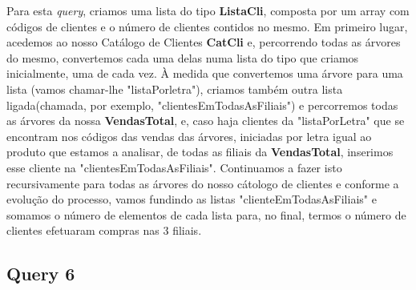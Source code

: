 \documentclass{article}
\begin{document}
\par\noindent\hspace{0.52cm} Para esta \textit{query}, criamos uma lista do tipo \textbf{ListaCli}, composta por um array com códigos de clientes e o número de clientes contidos no mesmo. Em primeiro lugar, acedemos ao nosso Catálogo de Clientes \textbf{CatCli} e, percorrendo todas as árvores do mesmo, convertemos cada uma delas numa lista do tipo que criamos inicialmente, uma de cada vez. À medida que convertemos uma árvore para uma lista (vamos chamar-lhe "listaPorletra"), criamos também outra lista ligada(chamada, por exemplo, "clientesEmTodasAsFiliais") e percorremos  todas as árvores da nossa \textbf{VendasTotal}, e, caso haja clientes da "listaPorLetra" que se encontram nos códigos das vendas das árvores, iniciadas por letra igual ao produto que estamos a analisar, de todas as filiais da     \textbf{VendasTotal}, inserimos esse cliente na "clientesEmTodasAsFiliais". Continuamos a fazer isto recursivamente para todas as árvores do nosso cátologo de clientes e conforme a evolução do processo, vamos fundindo as listas "clienteEmTodasAsFiliais" e somamos o número de elementos de cada lista para, no final, termos o número de clientes efetuaram compras nas 3 filiais.

\subsection{Query 6}

\noindent{}
\vspace{1cm}
\end{document}
